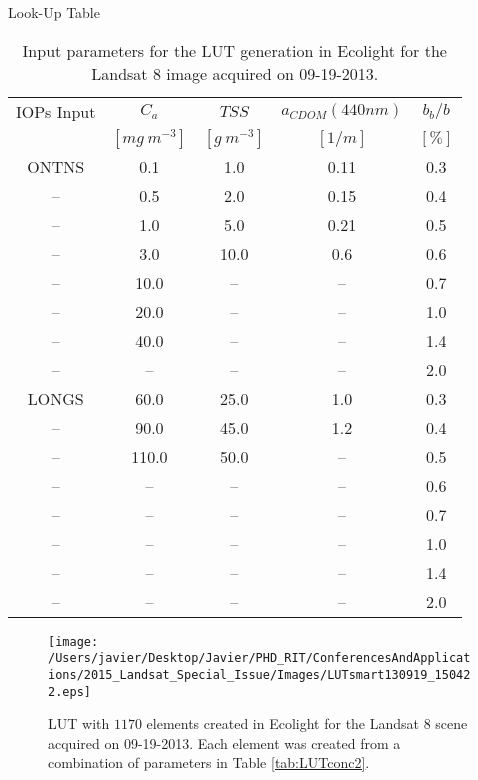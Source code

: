 \documentclass{beamer}
\begin{document}
\begin{frame}{}
\begin{columns}[t]
\begin{column}{.31\linewidth}
\begin{block}{Look-Up Table}
\begin{table}[htb]
\caption{Input parameters for the LUT generation in Ecolight for the Landsat 8 image acquired on 09-19-2013. \label{tab:LUTconc2}} 
\vspace{.07cm}
\scriptsize
\centering
    \begin{tabular}{c|c|c|c|c}
    \hline \hline
            IOPs Input & \bfseries{$C_a$} & \bfseries{$TSS$} & \bfseries{$a_{CDOM}(440nm)$} & \bfseries{$b_b/b$}    \\
                   & $[mg~m^{-3}]$        & $[g~m^{-3}]$       &  $[1/m]$           & $[\%]$            \\ \hline \hline
ONTNS   &  0.1    & 1.0     &  0.11   &  0.3  \\
--    &  0.5    & 2.0     &  0.15   &  0.4  \\
--      &  1.0    & 5.0     &  0.21   &  0.5  \\
--      &  3.0    & 10.0    &  0.6    &  0.6  \\ 
--    &  10.0     & --    &  --   &  0.7  \\  
--      &  20.0     & --    &  --   &  1.0  \\  
--      &  40.0     & --    &  --   &  1.4  \\
--      &  --       & --    &  --   &  2.0  \\ \hline

LONGS   &  60.0   & 25.0    &  1.0    &  0.3  \\
--      &  90.0   & 45.0    &  1.2    &  0.4  \\
--      &  110.0  & 50.0    &  --     &  0.5  \\
--      &  --     & --      &  --     &  0.6  \\  
--      &  --     & --      &  --     &  0.7  \\  
--      &  --     & --      &  --     &  1.0  \\   
--      &  --     & --      &  --     &  1.4  \\  
--      &  --     & --      &  --     &  2.0  \\  \hline \hline
    \end{tabular}
  \end{table}


\begin{figure}[htb]
    \centering
      \texttt{[image: /Users/javier/Desktop/Javier/PHD\_RIT/ConferencesAndApplications/2015\_Landsat\_Special\_Issue/Images/LUTsmart130919\_150422.eps]}
      \caption{LUT with $1170$ elements created in Ecolight for the Landsat 8 scene acquired on 09-19-2013. Each element was created from a combination of parameters in Table \autoref{tab:LUTconc2}.}
      \label{fig:LUT}


\end{figure}
\end{block}
\end{column}
\end{columns}
\end{frame}
\end{document}
